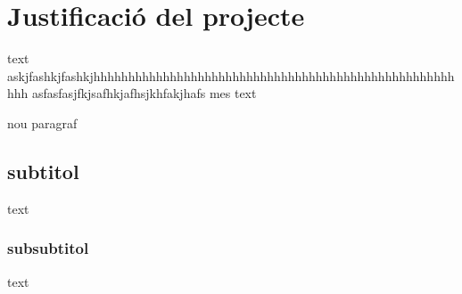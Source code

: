 \section{Justificaci\'o del projecte}
text askjfashkjfashkjhhhhhhhhhhhhhhhhhhhhhhhhhhhhhhhhhhhhhhhhhhhhhhhhhhhhhhh
asfasfasjfkjsafhkjafhsjkhfakjhafs
mes text

nou paragraf

\subsection{subtitol}
text

\subsubsection{subsubtitol}
text
